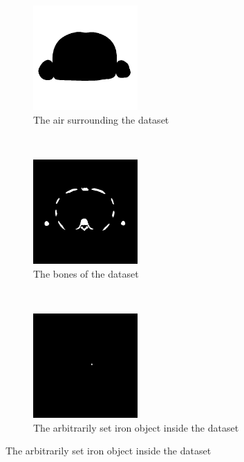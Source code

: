 \begin{figure}[h!]
	\centering
	\begin{subfigure}[h]{0.3\textwidth}
		\centering
		\includegraphics[height=4cm]{images/KoreanAir.png}
		\caption{The air surrounding the dataset}
		\label{korean1}
	\end{subfigure}%
	~
	\begin{subfigure}[h]{0.3\textwidth}
		\centering
		\includegraphics[height=4cm]{images/KoreanBone.png}
		\caption{The bones of the dataset\linebreak}
		\label{korean2}
	\end{subfigure}%
	~
	\begin{subfigure}[h]{0.3\textwidth}
		\centering
		\includegraphics[height=4cm]{images/KoreanIron.png}
		\caption{The arbitrarily set iron object inside the dataset}
		\label{korean3}
	\end{subfigure}%
	

\end{figure}
